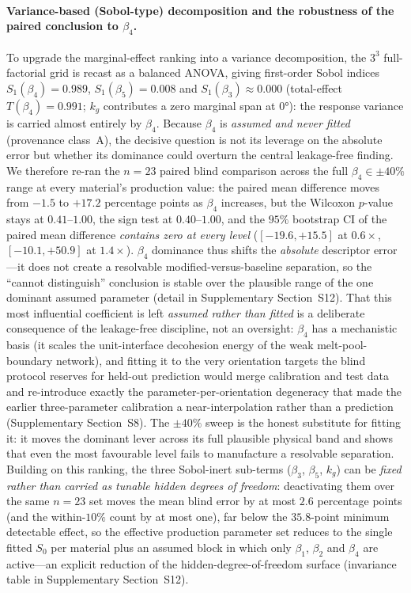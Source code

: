 \documentclass[12pt,a4paper,twocolumn]{article}
\begin{document}
\paragraph{Variance-based (Sobol-type) decomposition and the robustness of the paired conclusion to $\beta_4$.} To upgrade the marginal-effect ranking into a variance decomposition, the $3^3$ full-factorial grid is recast as a balanced ANOVA, giving first-order Sobol indices $S_1(\beta_4) = 0.989$, $S_1(\beta_5) = 0.008$ and $S_1(\beta_3) \approx 0.000$ (total-effect $T(\beta_4) = 0.991$; $k_g$ contributes a zero marginal span at $\ang{0}$): the response variance is carried almost entirely by $\beta_4$. Because $\beta_4$ is \emph{assumed and never fitted} (provenance class~A), the decisive question is not its leverage on the absolute error but whether its dominance could overturn the central leakage-free finding. We therefore re-ran the $n = 23$ paired blind comparison across the full $\beta_4 \in \pm 40\%$ range at every material's production value: the paired mean difference moves from $-1.5$ to $+17.2$ percentage points as $\beta_4$ increases, but the Wilcoxon $p$-value stays at $0.41$--$1.00$, the sign test at $0.40$--$1.00$, and the $95\%$ bootstrap CI of the paired mean difference \emph{contains zero at every level} ($[-19.6,+15.5]$ at $0.6\times$, $[-10.1,+50.9]$ at $1.4\times$). $\beta_4$ dominance thus shifts the \emph{absolute} descriptor error---it does not create a resolvable modified-versus-baseline separation, so the ``cannot distinguish'' conclusion is stable over the plausible range of the one dominant assumed parameter (detail in Supplementary Section~S12). That this most influential coefficient is left \emph{assumed rather than fitted} is a deliberate consequence of the leakage-free discipline, not an oversight: $\beta_4$ has a mechanistic basis (it scales the unit-interface decohesion energy of the weak melt-pool-boundary network), and fitting it to the very orientation targets the blind protocol reserves for held-out prediction would merge calibration and test data and re-introduce exactly the parameter-per-orientation degeneracy that made the earlier three-parameter calibration a near-interpolation rather than a prediction (Supplementary Section~S8). The $\pm40\%$ sweep is the honest substitute for fitting it: it moves the dominant lever across its full plausible physical band and shows that even the most favourable level fails to manufacture a resolvable separation. Building on this ranking, the three Sobol-inert sub-terms ($\beta_3$, $\beta_5$, $k_g$) can be \emph{fixed rather than carried as tunable hidden degrees of freedom}: deactivating them over the same $n = 23$ set moves the mean blind error by at most $2.6$ percentage points (and the within-$10\%$ count by at most one), far below the $35.8$-point minimum detectable effect, so the effective production parameter set reduces to the single fitted $S_0$ per material plus an assumed block in which only $\beta_1$, $\beta_2$ and $\beta_4$ are active---an explicit reduction of the hidden-degree-of-freedom surface (invariance table in Supplementary Section~S12).
\end{document}
